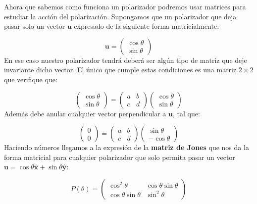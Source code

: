 \documentclass[12pt,a4paper]{article}
\newcommand{\un}{\mathbf{u}}
\newcommand{\hnx}{\hat{\mathbf{x}}}
\newcommand{\hny}{\hat{\mathbf{y}}}
\numberwithin{equation}{section}
\numberwithin{figure}{section}
\begin{document}
Ahora que sabemos como funciona un polarizador podremos usar matrices para estudiar la acción del polarización. Supongamos que un polarizador que deja pasar solo un vector $\un$ expresado de la siguiente forma matricialmente:

\begin{equation}
\un = \begin{pmatrix}
\cos \theta \\
\sin \theta 
\end{pmatrix}
\end{equation}
En ese caso nuestro polarizador tendrá deberá ser algún tipo de matriz que deje invariante dicho vector. El único que cumple estas condiciones es una matriz $2 \times 2$ que verifique que:

\begin{equation}
\begin{pmatrix}
\cos \theta \\
\sin \theta
\end{pmatrix} = \begin{pmatrix}
a & b \\ 
c & d 
\end{pmatrix}
\begin{pmatrix}
\cos \theta \\
\sin \theta
\end{pmatrix}
\end{equation}
Además debe anular cualquier vector perpendicular a $\un$, tal que:

\begin{equation}
\begin{pmatrix}
0 \\
0 
\end{pmatrix} = \begin{pmatrix}
a & b \\ 
c & d 
\end{pmatrix}
\begin{pmatrix}
\sin \theta \\
- \cos \theta
\end{pmatrix}
\end{equation}
Haciendo números llegamos a la expresión de la \textbf{matriz de Jones} que nos da la forma matricial para cualquier polarizador que solo permita pasar un vector $\un = \cos \theta \hnx + \sin \theta \hny$:

\begin{equation}
P(\theta) = \begin{pmatrix}
\cos^2 \theta & \cos \theta \sin \theta \\
\cos \theta \sin \theta & \sin^2 \theta
\end{pmatrix}
\end{equation}
\end{document}
